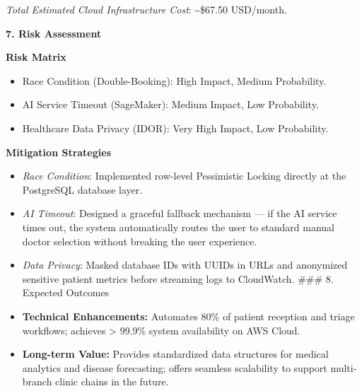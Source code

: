 \emph{Total Estimated Cloud Infrastructure Cost}: \textasciitilde\$67.50
USD/month.

\vspace{0.5em}\noindent\textbf{7. Risk Assessment}

\vspace{0.5em}\noindent\textbf{Risk Matrix}

\begin{itemize}
\tightlist
\item
  Race Condition (Double-Booking): High Impact, Medium Probability.
\item
  AI Service Timeout (SageMaker): Medium Impact, Low Probability.
\item
  Healthcare Data Privacy (IDOR): Very High Impact, Low Probability.
\end{itemize}

\vspace{0.5em}\noindent\textbf{Mitigation Strategies}

\begin{itemize}
\tightlist
\item
  \emph{Race Condition}: Implemented row-level Pessimistic Locking
  directly at the PostgreSQL database layer.\\
\item
  \emph{AI Timeout}: Designed a graceful fallback mechanism --- if the
  AI service times out, the system automatically routes the user to
  standard manual doctor selection without breaking the user
  experience.\\
\item
  \emph{Data Privacy}: Masked database IDs with UUIDs in URLs and
  anonymized sensitive patient metrics before streaming logs to
  CloudWatch. \#\#\# 8. Expected Outcomes
\item
  \textbf{Technical Enhancements:} Automates 80\% of patient reception
  and triage workflows; achieves \textgreater{} 99.9\% system
  availability on AWS Cloud.\\
\item
  \textbf{Long-term Value:} Provides standardized data structures for
  medical analytics and disease forecasting; offers seamless scalability
  to support multi-branch clinic chains in the future.
\end{itemize}
